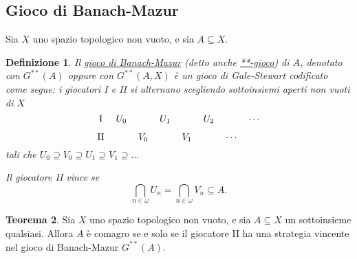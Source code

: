 \documentclass[titlepage]{article}
\newcommand{\1}{\mathds{1}}
\theoremstyle{definition}%
\newtheorem{thm}{Teorema}[section]
\theoremstyle{plain}
\newtheorem{defn}[thm]{Definizione}
\theoremstyle{remark}
\begin{document}
\subsection{Gioco di Banach-Mazur}
\label{sec:orge8e0b9e}
Sia \(X\) uno {spazio topologico} non vuoto, e sia \(A \subseteq X\).

\begin{defn}
Il \uline{gioco di Banach-Mazur} (detto anche \uline{**-gioco}) di \(A\), denotato con \(G^{**}(A)\) oppure con \(G^{**}(A,X)\) è un gioco {di Gale-Stewart} codificato come segue: i giocatori I e II si alternano scegliendo sottoinsiemi aperti non vuoti di \(X\)
\begin{equation*}
\begin{tikzcd}[ampersand replacement=\&,cramped,sep=tiny]
	{\text{I}} \& {U_0} \&\& {U_1} \&\& {U_2} \&\& \cdots \\
	{\text{II}} \&\& {V_0} \&\& {V_1} \&\& \cdots
\end{tikzcd}
\end{equation*}
tali che \(U_{0}\supseteq V_{0}\supseteq U_{1}\supseteq V_{1}\supseteq \dots\)

Il giocatore II vince se
\begin{equation*}
\bigcap_{n \in \omega} U_{n} = \bigcap_{n \in \omega} V_{n} \subseteq A.
\end{equation*}
\end{defn}

\begin{thm}\label{sec:org5e232d7}
Sia \(X\) uno {spazio topologico} {non vuoto}, e sia \(A \subseteq X\) un {sottoinsieme} qualsiasi. Allora \(A\) è {comagro} se e solo se il giocatore II ha una {strategia vincente} nel {gioco di Banach-Mazur} \(G^{**}(A)\).
\end{thm}
\end{document}
